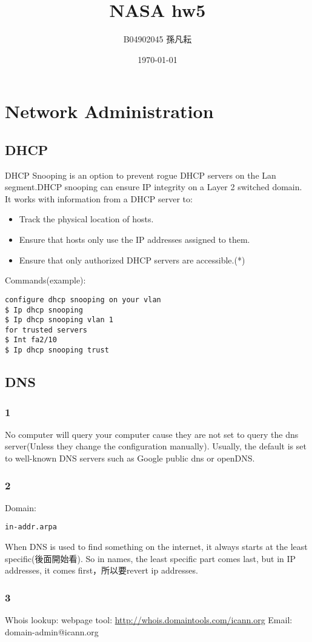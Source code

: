 \documentclass{article}
\title{NASA hw5}
\author{B04902045 孫凡耘}
\date{\today}
\providecommand{\tightlist}{
      \setlength{\itemsep}{0pt}\setlength{\parskip}{0pt}}
\begin{document}
\maketitle
    \section{Network Administration}
    \subsection{DHCP}
    DHCP Snooping is an option to prevent rogue DHCP servers on the Lan segment.DHCP snooping can ensure IP integrity on a Layer 2 switched domain. It works with information from a DHCP server to:
\begin{itemize}
\tightlist
\item
    Track the physical location of hosts.
\item
    Ensure that hosts only use the IP addresses assigned to them.
\item
    Ensure that only authorized DHCP servers are accessible.(*)
\end{itemize}
Commands(example):
\begin{verbatim}
configure dhcp snooping on your vlan
$ Ip dhcp snooping
$ Ip dhcp snooping vlan 1
for trusted servers
$ Int fa2/10
$ Ip dhcp snooping trust
\end{verbatim}
    \subsection{DNS}
    \subsubsection{1}
    No computer will query your computer cause they are not set to query the dns server(Unless they change the configuration manually). Usually, the default is set to well-known DNS servers such as Google public dns or openDNS.
    \subsubsection{2}
    Domain:\begin{verbatim}in-addr.arpa\end{verbatim}
    When DNS is used to find something on the internet, it always starts at the least specific(後面開始看).
    So in names, the least specific part comes last, but in IP addresses, it comes first，所以要revert ip addresses.
    \subsubsection{3}
    Whois lookup:\newline
    webpage tool: \url{http://whois.domaintools.com/icann.org}\newline
    Email: domain-admin@icann.org
\end{document}
